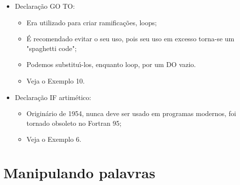 \documentclass[xcolor=table]{beamer}
\newenvironment{stepitemize}{\begin{itemize}[<+->]}{\end{itemize} }
\begin{document}
\begin{frame}%

\begin{stepitemize}
\item Declara\c{c}\~{a}o GO TO:

\begin{itemize}
\item Era utilizado para criar ramifica\c{c}\~{o}es, loops;

\item \'{E} recomendado evitar o seu uso, pois seu uso em excesso torna-se
um "spaghetti code";

\item Podemos substitu\'{\i}-los, enquanto loop, por um DO vazio.

\item Veja o Exemplo 10.
\end{itemize}

\item Declara\c{c}\~{a}o IF artim\'{e}tico:

\begin{itemize}
\item Origin\'{a}rio de 1954, nunca deve ser usado em programas modernos,
foi tornado obsoleto no Fortran 95;

\item Veja o Exemplo 6.
\end{itemize}
\end{stepitemize}

\transboxout%
\end{frame}%

\section{Manipulando palavras}
\end{document}
